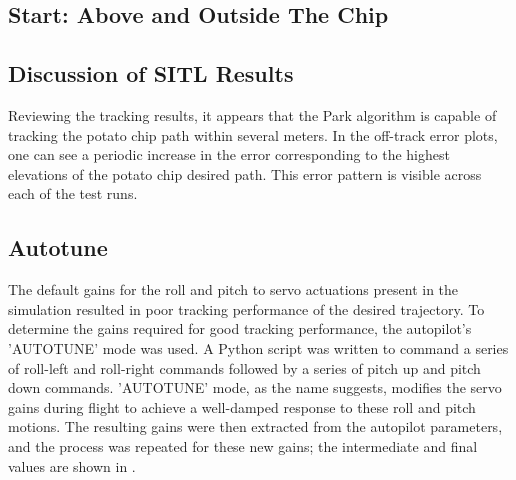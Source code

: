 \documentclass{aiaa}
\begin{document}
\subsection{Start: Above and Outside The Chip}
\subsection{Discussion of SITL Results}
Reviewing the tracking results, it appears that the Park algorithm is capable of tracking the potato chip path within several meters. In the off-track error plots, one can see a periodic increase in the error corresponding to the highest elevations of the potato chip desired path. This error pattern is visible across each of the test runs.
\subsection{Autotune}
The default gains for the roll and pitch to servo actuations present in the simulation resulted in poor tracking performance of the desired trajectory. To determine the gains required for good tracking performance, the autopilot's 'AUTOTUNE' mode was used. A Python script was written to command a series of roll-left and roll-right commands followed by a series of pitch up and pitch down commands. 'AUTOTUNE' mode, as the name suggests, modifies the servo gains during flight to achieve a well-damped response to these roll and pitch motions. The resulting gains were then extracted from the autopilot parameters, and the process was repeated for these new gains; the intermediate and final values are shown in .

\end{document}
